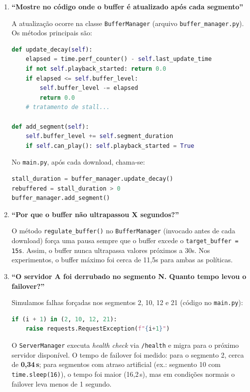 \documentclass[
    12pt,
    a4paper,
    oneside
]{article}
\begin{document}
\begin{enumerate}
    \item \textbf{“Mostre no código onde o buffer é atualizado após cada segmento”}

    A atualização ocorre na classe \texttt{BufferManager} (arquivo \texttt{buffer\_manager.py}). Os métodos principais são:
    \begin{lstlisting}[language=Python, breaklines=true, frame=single, basicstyle=\footnotesize]
def update_decay(self):
    elapsed = time.perf_counter() - self.last_update_time
    if not self.playback_started: return 0.0
    if elapsed <= self.buffer_level:
        self.buffer_level -= elapsed
        return 0.0
    # tratamento de stall...

def add_segment(self):
    self.buffer_level += self.segment_duration
    if self.can_play(): self.playback_started = True
    \end{lstlisting}
    No \texttt{main.py}, após cada download, chama-se:
    \begin{lstlisting}[language=Python, breaklines=true, basicstyle=\footnotesize]
stall_duration = buffer_manager.update_decay()
rebuffered = stall_duration > 0
buffer_manager.add_segment()
    \end{lstlisting}

    \item \textbf{“Por que o buffer não ultrapassou X segundos?”}

    O método \texttt{regulate\_buffer()} no \texttt{BufferManager} (invocado antes de cada download) força uma pausa sempre que o buffer excede o \texttt{target\_buffer = 15s}. Assim, o buffer nunca ultrapassa valores próximos a 30s. Nos experimentos, o buffer máximo foi cerca de 11,5s para ambas as políticas.

    \item \textbf{“O servidor A foi derrubado no segmento N. Quanto tempo levou o failover?”}

    Simulamos falhas forçadas nos segmentos 2, 10, 12 e 21 (código no \texttt{main.py}):
    \begin{lstlisting}[language=Python, breaklines=true, basicstyle=\footnotesize]
if (i + 1) in (2, 10, 12, 21):
    raise requests.RequestException(f"{i+1}")
    \end{lstlisting}
    O \texttt{ServerManager} executa \textit{health check} via \texttt{/health} e migra para o próximo servidor disponível. O tempo de failover foi medido: para o segmento 2, cerca de \textbf{0,34\,s}; para segmentos com atraso artificial (ex.: segmento 10 com \texttt{time.sleep(16)}), o tempo foi maior (16,2\,s), mas em condições normais o failover leva menos de 1 segundo.


\end{enumerate}
\end{document}
